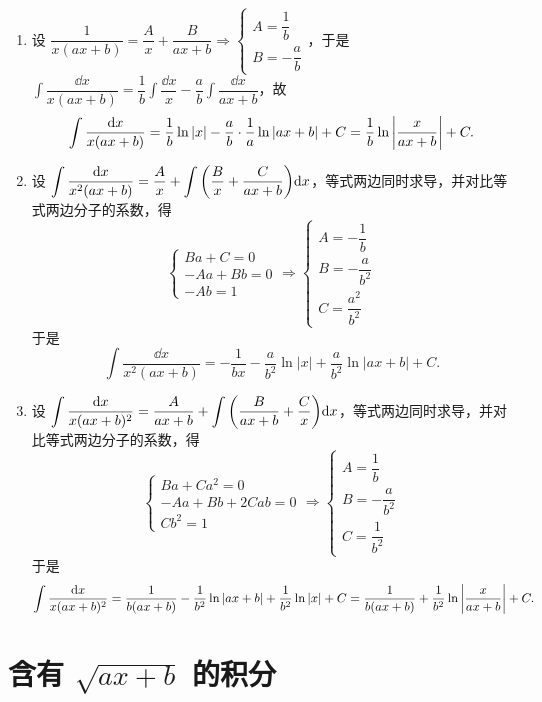 \begin{enumerate}[label=\roman{*}.]
    \item 设 $\dfrac{1}{x(ax+b)}=\dfrac{A}{x}+\dfrac{B}{ax+b}\Rightarrow \begin{cases}
                  A=\dfrac{1}{b} \\[6pt]B=-\dfrac{a}{b}
              \end{cases}$，于是 $\displaystyle\int\dfrac{\dd x}{x(ax+b)}=\dfrac{1}{b}\int\dfrac{\dd x}{x}-\dfrac{a}{b}\int\dfrac{\dd x}{ax+b}$，故
          $$\int\dfrac{\dd x}{x(ax+b)}=\dfrac{1}{b}\ln|x|-\dfrac{a}{b}\cdot\dfrac{1}{a}\ln|ax+b|+C=\dfrac{1}{b}\ln\qty|\dfrac{x}{ax+b}|+C.$$
    \item 设 $\displaystyle\int\dfrac{\dd x}{x^2(ax+b)}=\dfrac{A}{x}+\int\qty(\dfrac{B}{x}+\dfrac{C}{ax+b})\dd x$，等式两边同时求导，并对比等式两边分子的系数，得
          $$\begin{cases}
                  Ba+C=0 \\-Aa+Bb=0\\-Ab=1
              \end{cases}\Rightarrow\begin{cases}
                  A=-\dfrac{1}{b} \\[6pt]B=-\dfrac{a}{b^2}\\[6pt]C=\dfrac{a^2}{b^2}
              \end{cases}$$
          于是 $$\int\dfrac{\dd x}{x^2(ax+b)}=-\dfrac{1}{bx}-\dfrac{a}{b^2}\ln|x|+\dfrac{a}{b^2}\ln|ax+b|+C.$$
    \item 设 $\displaystyle\int\dfrac{\dd x}{x(ax+b)^2}=\dfrac{A}{ax+b}+\int\qty(\dfrac{B}{ax+b}+\dfrac{C}{x})\dd x$，等式两边同时求导，并对比等式两边分子的系数，得
          $$\begin{cases}
                  Ba+Ca^2=0 \\-Aa+Bb+2Cab=0\\Cb^2=1
              \end{cases}\Rightarrow\begin{cases}
                  A=\dfrac{1}{b} \\[6pt]B=-\dfrac{a}{b^2}\\[6pt]C=\dfrac{1}{b^2}
              \end{cases}$$
          于是 $$\int\dfrac{\dd x}{x(ax+b)^2}=\dfrac{1}{b(ax+b)}-\dfrac{1}{b^2}\ln|ax+b|+\dfrac{1}{b^2}\ln|x|+C=\dfrac{1}{b(ax+b)}+\dfrac{1}{b^2}\ln\qty|\dfrac{x}{ax+b}|+C.$$
\end{enumerate}

\section{含有 \texorpdfstring{$\sqrt{ax+b}$}. 的积分}

